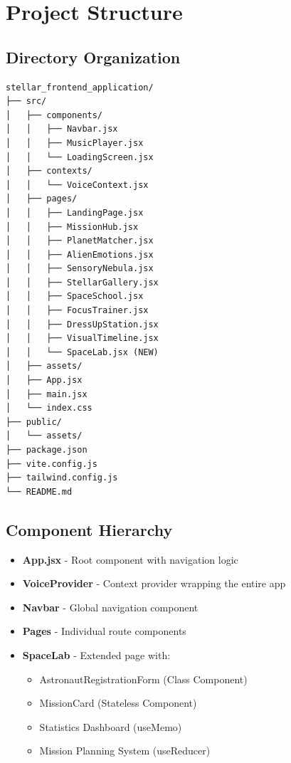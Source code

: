 \documentclass[12pt,a4paper]{article}
\begin{document}
\newpage

\section{Project Structure}

\subsection{Directory Organization}
\begin{verbatim}
stellar_frontend_application/
├── src/
│   ├── components/
│   │   ├── Navbar.jsx
│   │   ├── MusicPlayer.jsx
│   │   └── LoadingScreen.jsx
│   ├── contexts/
│   │   └── VoiceContext.jsx
│   ├── pages/
│   │   ├── LandingPage.jsx
│   │   ├── MissionHub.jsx
│   │   ├── PlanetMatcher.jsx
│   │   ├── AlienEmotions.jsx
│   │   ├── SensoryNebula.jsx
│   │   ├── StellarGallery.jsx
│   │   ├── SpaceSchool.jsx
│   │   ├── FocusTrainer.jsx
│   │   ├── DressUpStation.jsx
│   │   ├── VisualTimeline.jsx
│   │   └── SpaceLab.jsx (NEW)
│   ├── assets/
│   ├── App.jsx
│   ├── main.jsx
│   └── index.css
├── public/
│   └── assets/
├── package.json
├── vite.config.js
├── tailwind.config.js
└── README.md
\end{verbatim}

\subsection{Component Hierarchy}
\begin{itemize}
    \item \textbf{App.jsx} - Root component with navigation logic
    \item \textbf{VoiceProvider} - Context provider wrapping the entire app
    \item \textbf{Navbar} - Global navigation component
    \item \textbf{Pages} - Individual route components
    \item \textbf{SpaceLab} - Extended page with:
    \begin{itemize}
        \item AstronautRegistrationForm (Class Component)
        \item MissionCard (Stateless Component)
        \item Statistics Dashboard (useMemo)
        \item Mission Planning System (useReducer)
    \end{itemize}
\end{itemize}
\end{document}
